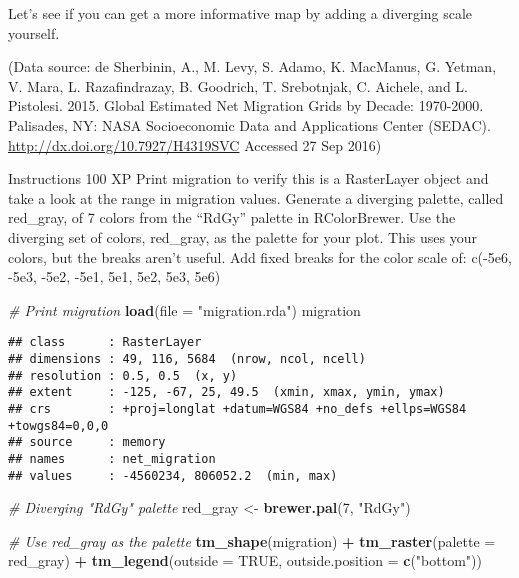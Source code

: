 \documentclass[]{article}
\newenvironment{Shaded}{\begin{snugshade}}{\end{snugshade}}
\newcommand{\CommentTok}[1]{\textcolor[rgb]{0.56,0.35,0.01}{\textit{#1}}}
\newcommand{\DataTypeTok}[1]{\textcolor[rgb]{0.13,0.29,0.53}{#1}}
\newcommand{\DecValTok}[1]{\textcolor[rgb]{0.00,0.00,0.81}{#1}}
\newcommand{\KeywordTok}[1]{\textcolor[rgb]{0.13,0.29,0.53}{\textbf{#1}}}
\newcommand{\NormalTok}[1]{#1}
\newcommand{\OperatorTok}[1]{\textcolor[rgb]{0.81,0.36,0.00}{\textbf{#1}}}
\newcommand{\OtherTok}[1]{\textcolor[rgb]{0.56,0.35,0.01}{#1}}
\newcommand{\StringTok}[1]{\textcolor[rgb]{0.31,0.60,0.02}{#1}}
\begin{document}
Let's see if you can get a more informative map by adding a diverging
scale yourself.

(Data source: de Sherbinin, A., M. Levy, S. Adamo, K. MacManus, G.
Yetman, V. Mara, L. Razafindrazay, B. Goodrich, T. Srebotnjak, C.
Aichele, and L. Pistolesi. 2015. Global Estimated Net Migration Grids by
Decade: 1970-2000. Palisades, NY: NASA Socioeconomic Data and
Applications Center (SEDAC). \url{http://dx.doi.org/10.7927/H4319SVC}
Accessed 27 Sep 2016)

Instructions 100 XP Print migration to verify this is a RasterLayer
object and take a look at the range in migration values. Generate a
diverging palette, called red\_gray, of 7 colors from the ``RdGy''
palette in RColorBrewer. Use the diverging set of colors, red\_gray, as
the palette for your plot. This uses your colors, but the breaks aren't
useful. Add fixed breaks for the color scale of: c(-5e6, -5e3, -5e2,
-5e1, 5e1, 5e2, 5e3, 5e6)

\begin{Shaded}
\begin{Highlighting}[]
\CommentTok{# Print migration}
\KeywordTok{load}\NormalTok{(}\DataTypeTok{file =} \StringTok{"migration.rda"}\NormalTok{)}
\NormalTok{migration}
\end{Highlighting}
\end{Shaded}

\begin{verbatim}
## class      : RasterLayer 
## dimensions : 49, 116, 5684  (nrow, ncol, ncell)
## resolution : 0.5, 0.5  (x, y)
## extent     : -125, -67, 25, 49.5  (xmin, xmax, ymin, ymax)
## crs        : +proj=longlat +datum=WGS84 +no_defs +ellps=WGS84 +towgs84=0,0,0 
## source     : memory
## names      : net_migration 
## values     : -4560234, 806052.2  (min, max)
\end{verbatim}

\begin{Shaded}
\begin{Highlighting}[]
\CommentTok{# Diverging "RdGy" palette}
\NormalTok{red_gray <-}\StringTok{ }\KeywordTok{brewer.pal}\NormalTok{(}\DecValTok{7}\NormalTok{, }\StringTok{"RdGy"}\NormalTok{)}

\CommentTok{# Use red_gray as the palette }
\KeywordTok{tm_shape}\NormalTok{(migration) }\OperatorTok{+}
\StringTok{  }\KeywordTok{tm_raster}\NormalTok{(}\DataTypeTok{palette =}\NormalTok{ red_gray) }\OperatorTok{+}
\StringTok{  }\KeywordTok{tm_legend}\NormalTok{(}\DataTypeTok{outside =} \OtherTok{TRUE}\NormalTok{, }\DataTypeTok{outside.position =} \KeywordTok{c}\NormalTok{(}\StringTok{"bottom"}\NormalTok{))}
\end{Highlighting}
\end{Shaded}
\end{document}
